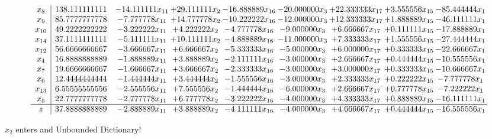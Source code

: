 \documentclass[10pt]{article}
\begin{document}
 \[\begin{array}{c| c c@{\hskip 2pt} c@{\hskip 2pt} c@{\hskip 2pt} c@{\hskip 2pt} c@{\hskip 2pt} c@{\hskip 2pt} c@{\hskip 2pt} }
 x_{8}   &  138.111111111 & -14.111111 x_{11} & + 29.111111 x_{2} & -16.888889 x_{16} & -20.000000 x_{3} & + 22.333333 x_{17} & + 3.555556 x_{15} & -85.444444 x_{1}\\
 x_{9}   &  85.7777777778 & -7.777778 x_{11} & + 14.777778 x_{2} & -10.222222 x_{16} & -12.000000 x_{3} & + 12.333333 x_{17} & + 1.888889 x_{15} & -46.111111 x_{1}\\
 x_{10}   &  49.2222222222 & -3.222222 x_{11} & + 4.222222 x_{2} & -4.777778 x_{16} & -9.000000 x_{3} & + 6.666667 x_{17} & + 0.111111 x_{15} & -17.888889 x_{1}\\
 x_{14}   &  37.1111111111 & -5.111111 x_{11} & + 10.111111 x_{2} & -4.888889 x_{16} & -11.000000 x_{3} & + 7.333333 x_{17} & + 1.555556 x_{15} & -27.444444 x_{1}\\
 x_{12}   &  56.6666666667 & -3.666667 x_{11} & + 6.666667 x_{2} & -5.333333 x_{16} & -5.000000 x_{3} & + 6.000000 x_{17} & + 0.333333 x_{15} & -22.666667 x_{1}\\
 x_{4}   &  16.8888888889 & -1.888889 x_{11} & + 3.888889 x_{2} & -2.111111 x_{16} & -3.000000 x_{3} & + 2.666667 x_{17} & + 0.444444 x_{15} & -10.555556 x_{1}\\
 x_{7}   &  19.6666666667 & -1.666667 x_{11} & + 3.666667 x_{2} & -2.333333 x_{16} & -3.000000 x_{3} & + 3.000000 x_{17} & + 0.333333 x_{15} & -10.666667 x_{1}\\
 x_{6}   &  12.4444444444 & -1.444444 x_{11} & + 3.444444 x_{2} & -1.555556 x_{16} & -3.000000 x_{3} & + 2.333333 x_{17} & + 0.222222 x_{15} & -7.777778 x_{1}\\
 x_{13}   &  6.55555555556 & -2.555556 x_{11} & + 7.555556 x_{2} & -1.444444 x_{16} & -6.000000 x_{3} & + 2.666667 x_{17} & + 0.777778 x_{15} & -7.222222 x_{1}\\
 x_{5}   &  22.7777777778 & -2.777778 x_{11} & + 6.777778 x_{2} & -3.222222 x_{16} & -4.000000 x_{3} & + 4.333333 x_{17} & + 0.888889 x_{15} & -16.111111 x_{1}\\
\hline
z    &  37.8888888889 & -2.888889 x_{11} & + 3.888889 x_{2} & -4.111111 x_{16} & -4.000000 x_{3} & + 4.666667 x_{17} & + 0.444444 x_{15} & -16.555556 x_{1}\\
\end{array}\]


 $ x_{2} $ enters and Unbounded Dictionary!
\end{document}
